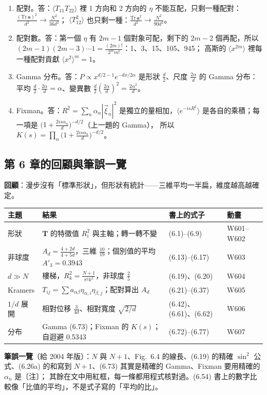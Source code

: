 {\begin{enumerate}[label=\textbf{6.\arabic*},itemsep=0.05em]
\item 配對。\quad 答：$\langle T_{11}T_{22}\rangle$ 裡 1 方向和 2 方向的 $\eta$ 不能互配，只剩一種配對：$\frac{(\mathrm{Tr}\,\mathbf a)^2}{d^2}\to\frac{N^2}{36d^2}$；
$\langle T_{12}^2\rangle$ 也只剩一種：$\frac{\mathrm{Tr}\,\mathbf a^2}{d^2}\to\frac{N^2}{90d^2}$。
\item 配對數。\quad 答：第一個 $\eta$ 有 $2m-1$ 個對象可配，剩下的 $2m-2$ 個再配，所以 $(2m-1)(2m-3)\cdots1=\frac{(2m)!}{2^mm!}$：1、3、15、105、945；
高斯的 $\langle x^{2m}\rangle$ 裡每一種配對貢獻 $\langle x^2\rangle^m=1$。
\item Gamma 分布。\quad 答：$P\propto x^{d/2-1}e^{-dx/2\alpha}$ 是形狀 $\frac d2$、尺度 $\frac{2\alpha}d$ 的 Gamma 分布：平均 $\frac d2\cdot\frac{2\alpha}d=\alpha$、變異數 $\frac d2(\frac{2\alpha}d)^2=\frac{2\alpha^2}d$。
\item Fixman。\quad 答：$R^2=\sum_n\alpha_n|\vec\xi_n|^2$ 是獨立的量相加，$\langle e^{-isR^2}\rangle$ 是各自的乘積；每一項是 $\big(1+\frac{2is\alpha_n}d\big)^{-d/2}$（上一題的 Gamma），
所以 $K(s)=\prod_n\big(1+\frac{2is\alpha_n}d\big)^{-d/2}$。
\end{enumerate}}

\subsection{第 6 章的回顧與筆誤一覽}
\textbf{回顧}：漫步沒有「標準形狀」，但形狀有統計——三維平均一半扁，維度越高越確定。
\begin{center}
\small\setlength{\tabcolsep}{4pt}
\begin{tabular}{@{}llll@{}}
\toprule
主題 & 結果 & 書上的式子 & 動畫\\
\midrule
形狀 & $\mathbf T$ 的特徵值 $R_i^2$ 與主軸；轉一轉不變 & (6.1)--(6.9) & W601--W602\\
非球度 & $A_d=\frac{4+2d}{4+5d}$，三維 $\frac{10}{19}$；個別值的平均 $A'_3=0.3943$ & (6.13)--(6.17) & W603\\
$d\gg N$ & 樓梯，$R_k^2=\frac{N+1}{\pi^2k^2}$，非球度 $\frac25$ & (6.19)、(6.20) & W604\\
Kramers & $T_{ij}=\sum a_{\alpha\beta}\eta_{\alpha,i}\eta_{\beta,j}$；配對算出 $A_d$ & (6.21)--(6.37) & W605\\
$1/d$ 展開 & 相對位移 $\frac3{4d}$、相對寬度 $\sqrt{2/d}$ & (6.42)、(6.61)、(6.62) & W606\\
分布 & Gamma (6.73)；Fixman 的 $K(s)$；自迴避 0.5343 & (6.72)--(6.77) & W607\\
\bottomrule
\end{tabular}
\end{center}
\textbf{筆誤一覽}（給 2004 年版）：$N$ 與 $N+1$、Fig.~6.4 的線長、(6.19) 的精確 $\sin^2$ 公式、(6.26a) 的和寫到 $N+1$、(6.73) 其實是精確的 Gamma、Fixman 要用精確的 $\alpha_n$ 是〔注〕；
其餘在文中用紅框，每一條都用程式核對過。(6.54) 書上的數字比較像「比值的平均」，不是式子寫的「平均的比」。
\begin{center}
\footnotesize
\SixTabErrata
\end{center}

